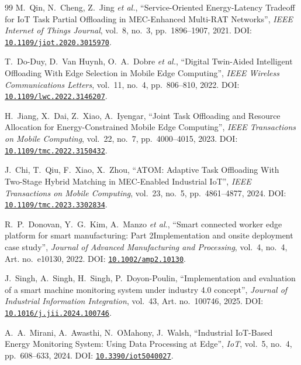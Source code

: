 \documentclass[conference]{IEEEtran}
\begin{document}
\begin{thebibliography}{99}
 M.~Qin, N.~Cheng, Z.~Jing \emph{et al.}, ``Service-Oriented Energy-Latency Tradeoff for IoT Task Partial Offloading in MEC-Enhanced Multi-RAT Networks'', \emph{IEEE Internet of Things Journal}, vol.~8, no.~3, pp.~1896--1907, 2021. DOI: \href{https://doi.org/10.1109/jiot.2020.3015970}{\nolinkurl{10.1109/jiot.2020.3015970}}.

 T.~Do-Duy, D.~Van Huynh, O.~A.~Dobre \emph{et al.}, ``Digital Twin-Aided Intelligent Offloading With Edge Selection in Mobile Edge Computing'', \emph{IEEE Wireless Communications Letters}, vol.~11, no.~4, pp.~806--810, 2022. DOI: \href{https://doi.org/10.1109/lwc.2022.3146207}{\nolinkurl{10.1109/lwc.2022.3146207}}.

 H.~Jiang, X.~Dai, Z.~Xiao, A.~Iyengar, ``Joint Task Offloading and Resource Allocation for Energy-Constrained Mobile Edge Computing'', \emph{IEEE Transactions on Mobile Computing}, vol.~22, no.~7, pp.~4000--4015, 2023. DOI: \href{https://doi.org/10.1109/tmc.2022.3150432}{\nolinkurl{10.1109/tmc.2022.3150432}}.

 J.~Chi, T.~Qiu, F.~Xiao, X.~Zhou, ``ATOM: Adaptive Task Offloading With Two-Stage Hybrid Matching in MEC-Enabled Industrial IoT'', \emph{IEEE Transactions on Mobile Computing}, vol.~23, no.~5, pp.~4861--4877, 2024. DOI: \href{https://doi.org/10.1109/tmc.2023.3302834}{\nolinkurl{10.1109/tmc.2023.3302834}}.

 R.~P.~Donovan, Y.~G.~Kim, A.~Manzo \emph{et al.}, ``Smart connected worker edge platform for smart manufacturing: Part 2Implementation and onsite deployment case study'', \emph{Journal of Advanced Manufacturing and Processing}, vol.~4, no.~4, Art. no.~e10130, 2022. DOI: \href{https://doi.org/10.1002/amp2.10130}{\nolinkurl{10.1002/amp2.10130}}.

 J.~Singh, A.~Singh, H.~Singh, P.~Doyon-Poulin, ``Implementation and evaluation of a smart machine monitoring system under industry 4.0 concept'', \emph{Journal of Industrial Information Integration}, vol.~43, Art. no.~100746, 2025. DOI: \href{https://doi.org/10.1016/j.jii.2024.100746}{\nolinkurl{10.1016/j.jii.2024.100746}}.

 A.~A.~Mirani, A.~Awasthi, N.~OMahony, J.~Walsh, ``Industrial IoT-Based Energy Monitoring System: Using Data Processing at Edge'', \emph{IoT}, vol.~5, no.~4, pp.~608--633, 2024. DOI: \href{https://doi.org/10.3390/iot5040027}{\nolinkurl{10.3390/iot5040027}}.


\end{thebibliography}
\end{document}
